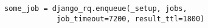 \begin{minipage}
    \begin{lstlisting}[caption={Example of a timeout.},label={killabnormaltaskscode}]
    some_job = django_rq.enqueue(_setup, jobs, 
            job_timeout=7200, result_ttl=1800)
    \end{lstlisting}
\end{minipage}